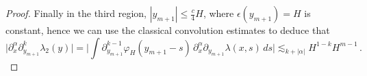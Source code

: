 \documentclass[reqno]{amsart}
\theoremstyle{definition}
\theoremstyle{remark}
\numberwithin{equation}{section}
\newcommand{\norm}[1]{\left\lVert#1\right\rVert}
\newcommand{\R}{\mathbb{R}}
\newcommand{\N}{\mathbb{N}}
\DeclareMathOperator{\dist}{dist}
\newcommand\res{\mathop{\hbox{\vrule height 7pt width .3pt depth 0pt\vrule height .3pt width 5pt depth 0pt}}\nolimits}
\newcommand{\bC}{\mathbf{C}} %
\begin{document}
\begin{proof}

Finally in the third region, $|y_{m+1}|\le \frac{c}{4} H$, where $\epsilon(y_{m+1})=H$ is constant, hence we can use the classical convolution estimates to deduce that 
\[
\bigl|\partial_x^\alpha \partial_{y_{m+1}}^k\lambda_2(y)\bigr| =  \Big|\int \partial^{k-1}_{y_{m+1}}\varphi_H(y_{m+1}-s)\, \partial_x^\alpha\partial_{y_{m+1}}\lambda(x,s)\, ds  \Big|\lesssim_{k+|\alpha|} H^{1-k} H^{m-1} \,.
\]

\end{proof}

\end{document}

